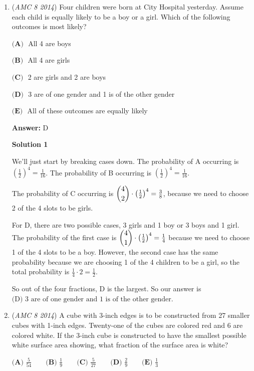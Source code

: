 \begin{enumerate}
	\item (\textit{AMC 8 2014}) Four children were born at City Hospital yesterday. Assume each child is equally likely to be a boy or a girl. Which of the following outcomes is most likely?


 $\textbf{(A) }$ All 4 are boys  


 $\textbf{(B) }$ All 4 are girls    


 $\textbf{(C) }$ 2 are girls and 2 are boys


 $\textbf{(D) }$ 3 are of one gender and 1 is of the other gender     


 $\textbf{(E) }$ All of these outcomes are equally likely


 
 \textbf{Answer: }D



\textbf{Solution 1}

We'll just start by breaking cases down. The probability of A occurring is $\left(\frac{1}{2}\right)^4 = \frac{1}{16}$. The probability of B occurring is $\left(\frac{1}{2}\right)^4 = \frac{1}{16}$.

 The probability of C occurring is $\dbinom{4}{2}\cdot \left(\frac{1}{2}\right)^4 = \frac{3}{8}$, because we need to choose 2 of the 4 slots to be girls. 

 For D, there are two possible cases, 3 girls and 1 boy or 3 boys and 1 girl. The probability of the first case is $\dbinom{4}{1}\cdot\left(\frac{1}{2}\right)^4 = \frac{1}{4}$ because we need to choose 1 of the 4 slots to be a boy. However, the second case has the same probability because we are choosing 1 of the 4 children to be a girl, so the total probability is $\frac{1}{4} \cdot 2 = \frac{1}{2}$.

 
So out of the four fractions, D is the largest. So our answer is $\boxed{\text{(D) 3 are of one gender and 1 is of the other gender}}.$



	\item (\textit{AMC 8 2014}) A cube with 3-inch edges is to be constructed from 27 smaller cubes with 1-inch edges. Twenty-one of the cubes are colored red and 6 are colored white. If the 3-inch cube is constructed to have the smallest possible white surface area showing, what fraction of the surface area is white?


 $\textbf{(A) }\frac{5}{54}\qquad\textbf{(B) }\frac{1}{9}\qquad\textbf{(C) }\frac{5}{27}\qquad\textbf{(D) }\frac{2}{9}\qquad\textbf{(E) }\frac{1}{3}$


\end{enumerate}
